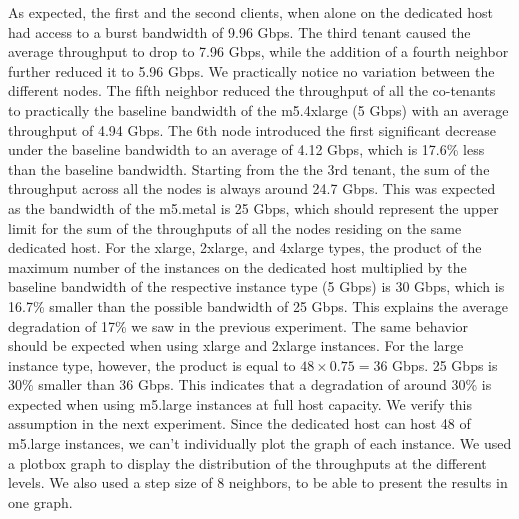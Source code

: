 \noindent
As expected, the first and the second clients, when alone on the dedicated host had access to a burst 
bandwidth of 9.96 Gbps. The third tenant caused the average throughput to drop to 7.96 Gbps, while the 
addition of a fourth neighbor further reduced it to 5.96 Gbps. We practically notice no variation between 
the different nodes. The fifth neighbor reduced the throughput of all the co-tenants to practically 
the baseline bandwidth of the m5.4xlarge (5 Gbps) with an average throughput of 4.94 Gbps. The 6th node 
introduced the first significant decrease under the baseline bandwidth to an average of 4.12 Gbps, 
which is 17.6\% less than the baseline bandwidth. Starting from the the 3rd tenant, the sum 
of the throughput across all the nodes is always around 24.7 Gbps.  This was expected as the bandwidth 
of the m5.metal is 25 Gbps, which should represent the upper limit for the sum of the throughputs of all the nodes
residing on the same dedicated host. For the xlarge, 2xlarge, and 4xlarge types, the product of the 
maximum number of the instances on the dedicated host multiplied by the baseline bandwidth of the respective
instance type (5 Gbps) is 30 Gbps, which is 16.7\% smaller than the possible bandwidth of 25 Gbps. 
This explains the average degradation of 17\% we saw in the previous experiment. The same behavior
should be expected when using xlarge and 2xlarge instances. For the large instance type, however, the 
product is equal to
\begin{math} 48 \times 0.75 = 36\end{math} Gbps. 
25 Gbps is 30\% smaller than 36 Gbps. This indicates that a  
degradation of around 30\% is expected when using m5.large instances at full host capacity. 
We verify this assumption in the next experiment. Since the dedicated host can host 48 of m5.large 
instances, we can't individually plot the graph of each instance. We used a plotbox graph to display the 
distribution of the throughputs at the different levels. We also used a step size of 8 neighbors, to be 
able to present the results in one graph. 

